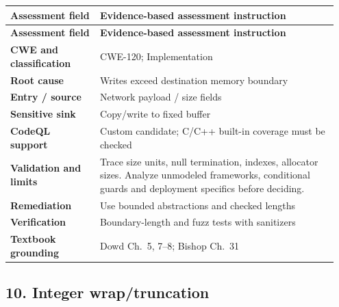 \documentclass[11pt,letterpaper,oneside]{book}
\begin{document}
\small
\setlength{\tabcolsep}{2pt}
\renewcommand{\arraystretch}{1.18}
\begin{longtable}{>{\raggedright\arraybackslash}p{0.26\linewidth}>{\raggedright\arraybackslash}p{0.69\linewidth}}
\toprule
\textbf{Assessment field} & \textbf{Evidence-based assessment instruction}\\
\midrule
\endfirsthead
\toprule
\textbf{Assessment field} & \textbf{Evidence-based assessment instruction}\\
\midrule
\endhead
\textbf{CWE and classification} & CWE-120; Implementation\\
\textbf{Root cause} & Writes exceed destination memory boundary\\
\textbf{Entry / source} & Network payload / size fields\\
\textbf{Sensitive sink} & Copy/write to fixed buffer\\
\textbf{CodeQL support} & Custom candidate; C/C++ built-in coverage must be checked\\
\textbf{Validation and limits} & Trace size units, null termination, indexes, allocator sizes. Analyze unmodeled frameworks, conditional guards and deployment specifics before deciding.\\
\textbf{Remediation} & Use bounded abstractions and checked lengths\\
\textbf{Verification} & Boundary-length and fuzz tests with sanitizers\\
\textbf{Textbook grounding} & Dowd Ch.~5, 7--8; Bishop Ch.~31\\
\bottomrule
\end{longtable}
\normalsize

\subsection{10. Integer wrap/truncation}
\end{document}
